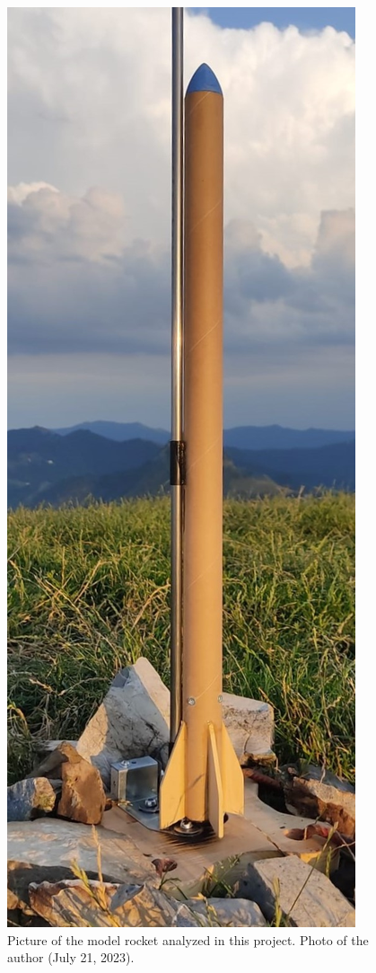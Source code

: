 \begin{figure}[H]
    \centering
    \includegraphics[width=.28\textwidth]{img/Rocket.jpg}
    \caption{Picture of the model rocket analyzed in this project. Photo of the author (July 21, 2023).}
    \label{fig:model_rocket_img}
\end{figure}